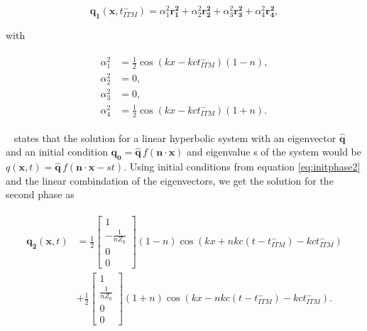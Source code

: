 \begin{equation}
    \mathbf{q_1}\left(\mathbf{x}, t_{ITM}^-\right) = \alpha_1^2 \mathbf{r_1^2} + \alpha_2^2 \mathbf{r_2^2} + \alpha_3^2 \mathbf{r_3^2} + \alpha_4^2 \mathbf{r_4^2},
    \label{eq:linearsum}
\end{equation}

with 

\begin{align}
    \begin{split}
        \alpha_1^2 &= \frac{1}{2}\cos\left(kx - k c t_{ITM}^-\right) \left(1 - n\right), \\
        \alpha_2^2 &= 0, \\
        \alpha_3^2 &= 0, \\
        \alpha_4^2 &= \frac{1}{2}\cos\left(kx - k c t_{ITM}^-\right) \left(1 + n\right) .
    \end{split}
\end{align}

~\parencite[Sec 18.5]{leveque_2002} states that the solution for a linear hyperbolic system with an eigenvector $\mathbf{\hat{q}}$ and an initial condition $\mathbf{q_0} = \mathbf{\hat{q}} \, f\left(\mathbf{n} \cdot \mathbf{x}\right)$
and eigenvalue s of the system would be $q\left(\mathbf{x}, t\right) = \mathbf{\hat{q}} \, f\left( \mathbf{n} \cdot \mathbf{x} - s t\right)$. 
Using initial conditions from equation \ref{eq:initphase2} and the linear combindation of the eigenvectors, we get the solution for the second phase as

\begin{align}
    \begin{split}
        \mathbf{q_2}\left(\mathbf{x}, t\right) &= 
        \frac{1}{2} \begin{bmatrix}
            1 \\
            -\frac{1}{nZ_0} \\
            0 \\
            0
        \end{bmatrix} \left(1 - n\right) \cos\left(kx +nk c \left(t - t_{ITM}^-\right) - k c t_{ITM}^-\right) \\ 
        &+ \frac{1}{2} 
        \begin{bmatrix}
            1 \\
            \frac{1}{nZ_0} \\
            0 \\
            0
        \end{bmatrix} \left(1 + n\right) \cos\left(kx - nk c \left(t - t_{ITM}^-\right) - k c t_{ITM}^-\right) .
    \end{split}
\end{align}

